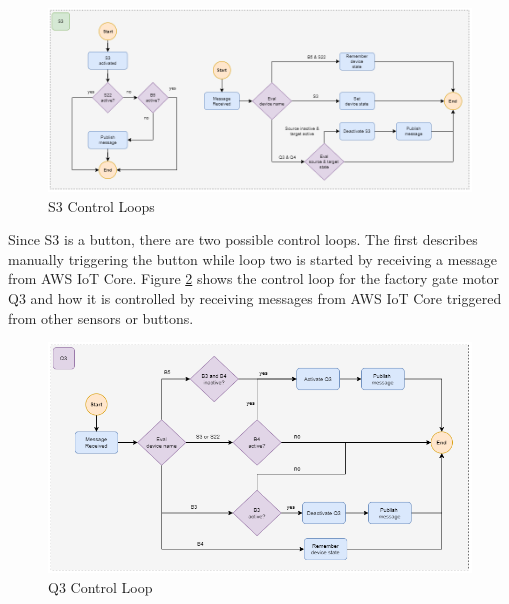 \begin{figure}[H]
	\centering
	\includegraphics[width=15cm]{images/flowchart_s3.png}
	\caption{S3 Control Loops}    
	\label{fig:FlowChartS3}
\end{figure}

Since S3 is a button, there are two possible control loops. The first describes manually triggering the button while loop two is started by receiving a message from AWS IoT Core. Figure \ref{fig:FlowChartQ3}  shows the control loop for the factory gate motor Q3 and how it is controlled by receiving messages from AWS IoT Core triggered from other sensors or buttons.

\begin{figure}[H]
	\centering
	\includegraphics[width=13cm]{images/flowchart_q3.png}
	\caption{Q3 Control Loop}    
	\label{fig:FlowChartQ3}
\end{figure}
